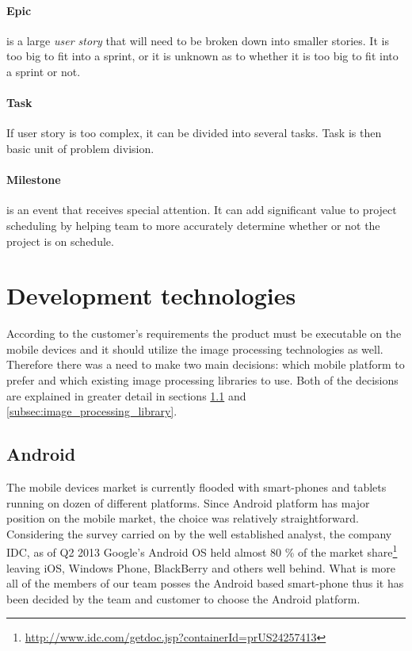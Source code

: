 \paragraph{Epic}
is a large \emph{user story} that will need to be broken down into smaller stories. It is too big to fit into a sprint, or it is unknown as to whether it is too big to fit into a sprint or not.

\paragraph{Task}
If user story is too complex, it can be divided into several tasks. 
Task is then basic unit of problem division.

\paragraph{Milestone} is an event that receives special attention. It can add significant value to project scheduling by helping team to more accurately determine whether or not the project is on schedule.


\section{Development technologies} \label{sec:development_technologies}

According to the customer's requirements the product must be executable on the mobile devices and it should utilize the image processing technologies as well. 
Therefore there was a need to make two main decisions: which mobile platform to prefer and which existing image processing libraries to use. 
Both of the decisions are explained in greater detail in sections \ref{subsec:mobile_platform} and \ref{subsec:image_processing_library}.


\subsection{Android} \label{subsec:mobile_platform}

The mobile devices market is currently flooded with smart-phones and tablets running on dozen of different platforms. 
Since Android platform has major position on the mobile market, the choice was relatively straightforward.
Considering the survey carried on by the well established analyst, the company IDC, as of Q2 2013 Google's Android OS held almost 80 \% of the market share\footnote{\url{http://www.idc.com/getdoc.jsp?containerId=prUS24257413}} leaving iOS, Windows Phone, BlackBerry and others well behind.
What is more all of the members of our team posses the Android based smart-phone thus it has been decided by the team and customer to choose the Android platform.


